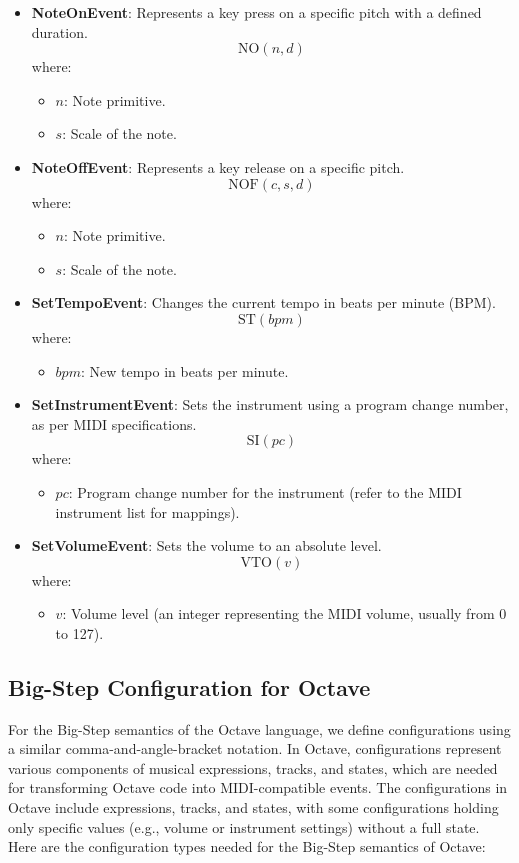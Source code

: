 \documentclass[letterpaper,12pt]{article}
\begin{document}
\begin{itemize}
    \item \textbf{NoteOnEvent}: Represents a key press on a specific pitch with a defined duration.
    \[
    \text{NO}(n, d)
    \]
    where:
    \begin{itemize}
        \item \( n \): Note primitive.
        \item \( s \): Scale of the note.
    \end{itemize}

    \item \textbf{NoteOffEvent}: Represents a key release on a specific pitch.
    \[
    \text{NOF}(c, s, d)
    \]
    where:
    \begin{itemize}
        \item \( n \): Note primitive.
        \item \( s \): Scale of the note.
    \end{itemize}

    \item \textbf{SetTempoEvent}: Changes the current tempo in beats per minute (BPM).
    \[
    \text{ST}(bpm)
    \]
    where:
    \begin{itemize}
        \item \( bpm \): New tempo in beats per minute.
    \end{itemize}

    \item \textbf{SetInstrumentEvent}: Sets the instrument using a program change number, as per MIDI specifications.
    \[
    \text{SI}(pc)
    \]
    where:
    \begin{itemize}
        \item \( pc \): Program change number for the instrument (refer to the MIDI instrument list for mappings).
    \end{itemize}

    \item \textbf{SetVolumeEvent}: Sets the volume to an absolute level.
    \[
    \text{VTO}(v)
    \]
    where:
    \begin{itemize}
        \item \( v \): Volume level (an integer representing the MIDI volume, usually from 0 to 127).
    \end{itemize}

\end{itemize}

\subsection{Big-Step Configuration for Octave}
For the Big-Step semantics of the Octave language, we define configurations using a similar comma-and-angle-bracket notation. In Octave, configurations represent various components of musical expressions, tracks, and states, which are needed for transforming Octave code into MIDI-compatible events. The configurations in Octave include expressions, tracks, and states, with some configurations holding only specific values (e.g., volume or instrument settings) without a full state. Here are the configuration types needed for the Big-Step semantics of Octave:
\end{document}
